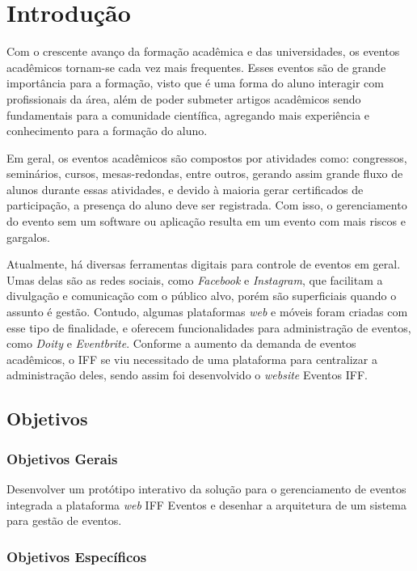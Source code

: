 \chapter{Introdução}

Com o crescente avanço da formação acadêmica e das universidades, os eventos acadêmicos tornam-se cada vez mais frequentes. Esses eventos são de grande importância para a formação, visto que é uma forma do aluno interagir com profissionais da área, além de poder submeter artigos acadêmicos sendo fundamentais para a comunidade científica, agregando mais experiência e conhecimento para a formação do aluno.

Em geral, os eventos acadêmicos são compostos por atividades como: congressos, seminários, cursos, mesas-redondas, entre outros, gerando assim grande fluxo de alunos durante essas atividades, e devido à maioria gerar certificados de participação, a presença do aluno deve ser registrada. Com isso, o gerenciamento do evento sem um software ou aplicação resulta em um evento com mais riscos e gargalos. 

Atualmente, há diversas ferramentas digitais para controle de eventos em geral. Umas delas são as redes sociais, como \textit{Facebook} e \textit{Instagram}, que facilitam a divulgação e comunicação com o público alvo, porém são superficiais quando o assunto é gestão. Contudo, algumas plataformas \textit{web} e móveis foram criadas com esse tipo de finalidade, e oferecem funcionalidades para administração de eventos, como \textit{Doity} e \textit{Eventbrite}. 
Conforme a aumento da demanda de eventos acadêmicos, o IFF se viu necessitado de uma plataforma para centralizar a administração deles, sendo assim foi desenvolvido o \textit{website} Eventos IFF.

\section{Objetivos}
\subsection{Objetivos Gerais}

Desenvolver um protótipo interativo da solução para o gerenciamento de eventos integrada a plataforma \textit{web} IFF Eventos e desenhar a arquitetura de um sistema para gestão de eventos.

\subsection{Objetivos Específicos}

